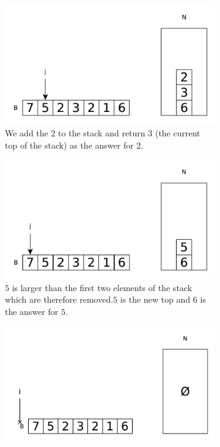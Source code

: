 \begin{figure}
\begin{subfigure}[t]{0.49\textwidth}
\begin{framed}
			\includegraphics[width=1\linewidth]{sources/next_greater_element/images/stack5}
		\end{framed}
		\caption{We add the $2$ to the stack and return $3$ (the current top of the stack) as the answer for $2$.}
		\label{fig:next_greater:variation1:stack5}
	 \end{subfigure}
	 \hfill
	 \begin{subfigure}[t]{0.49\textwidth}
		\begin{framed}
			\includegraphics[width=1\linewidth]{sources/next_greater_element/images/stack6}
		\end{framed}
		\caption{$5$ is larger than the first two elements of the stack which are therefore removed.$5$ is the new top and $6$ is the answer for $5$. }
		\label{fig:next_greater:variation1:stack6}
	 \end{subfigure}
	 \hfill
	 \begin{subfigure}[t]{0.49\textwidth}
		\begin{framed}
			\includegraphics[width=1\linewidth]{sources/next_greater_element/images/stack7}

\end{framed}
\end{subfigure}
\end{figure}
